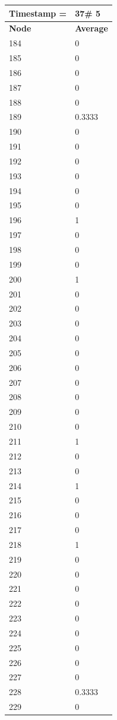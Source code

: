 \begin{tabular}{|l||l|}
\hline
\textbf{Timestamp =} & \textbf{37}\# 5\\\hline
	\textbf{Node} & \textbf{Average} \\ \hline
\hline
	184 & 0 \\ \hline
	185 & 0 \\ \hline
	186 & 0 \\ \hline
	187 & 0 \\ \hline
	188 & 0 \\ \hline
	189 & 0.3333 \\ \hline
	190 & 0 \\ \hline
	191 & 0 \\ \hline
	192 & 0 \\ \hline
	193 & 0 \\ \hline
	194 & 0 \\ \hline
	195 & 0 \\ \hline
	196 & 1 \\ \hline
	197 & 0 \\ \hline
	198 & 0 \\ \hline
	199 & 0 \\ \hline
	200 & 1 \\ \hline
	201 & 0 \\ \hline
	202 & 0 \\ \hline
	203 & 0 \\ \hline
	204 & 0 \\ \hline
	205 & 0 \\ \hline
	206 & 0 \\ \hline
	207 & 0 \\ \hline
	208 & 0 \\ \hline
	209 & 0 \\ \hline
	210 & 0 \\ \hline
	211 & 1 \\ \hline
	212 & 0 \\ \hline
	213 & 0 \\ \hline
	214 & 1 \\ \hline
	215 & 0 \\ \hline
	216 & 0 \\ \hline
	217 & 0 \\ \hline
	218 & 1 \\ \hline
	219 & 0 \\ \hline
	220 & 0 \\ \hline
	221 & 0 \\ \hline
	222 & 0 \\ \hline
	223 & 0 \\ \hline
	224 & 0 \\ \hline
	225 & 0 \\ \hline
	226 & 0 \\ \hline
	227 & 0 \\ \hline
	228 & 0.3333 \\ \hline
	229 & 0 \\ \hline
\end{tabular}
